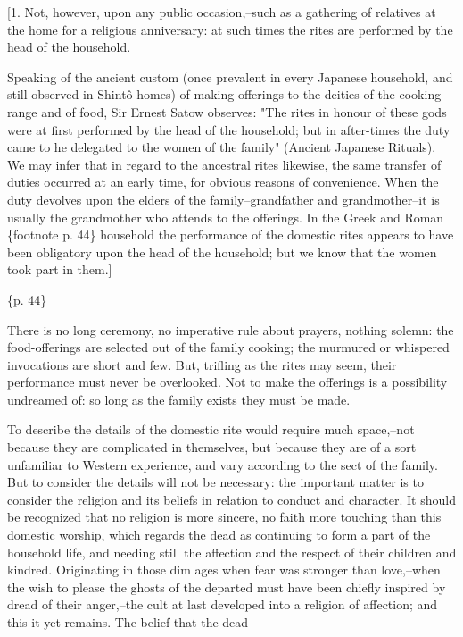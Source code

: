 [1. Not, however, upon any public occasion,--such as a gathering of relatives at the home for a religious anniversary: at such times the rites are performed by the head of the household.

Speaking of the ancient custom (once prevalent in every Japanese household, and still observed in Shintô homes) of making offerings to the deities of the cooking range and of food, Sir Ernest Satow observes: "The rites in honour of these gods were at first performed by the head of the household; but in after-times the duty came to he delegated to the women of the family" (Ancient Japanese Rituals). We may infer that in regard to the ancestral rites likewise, the same transfer of duties occurred at an early time, for obvious reasons of convenience. When the duty devolves upon the elders of the family--grandfather and grandmother--it is usually the grandmother who attends to the offerings. In the Greek and Roman \{footnote p. 44\} household the performance of the domestic rites appears to have been obligatory upon the head of the household; but we know that the women took part in them.]

\{p. 44\}

There is no long ceremony, no imperative rule about prayers, nothing solemn: the food-offerings are selected out of the family cooking; the murmured or whispered invocations are short and few. But, trifling as the rites may seem, their performance must never be overlooked. Not to make the offerings is a possibility undreamed of: so long as the family exists they must be made.

To describe the details of the domestic rite would require much space,--not because they are complicated in themselves, but because they are of a sort unfamiliar to Western experience, and vary according to the sect of the family. But to consider the details will not be necessary: the important matter is to consider the religion and its beliefs in relation to conduct and character. It should be recognized that no religion is more sincere, no faith more touching than this domestic worship, which regards the dead as continuing to form a part of the household life, and needing still the affection and the respect of their children and kindred. Originating in those dim ages when fear was stronger than love,--when the wish to please the ghosts of the departed must have been chiefly inspired by dread of their anger,--the cult at last developed into a religion of affection; and this it yet remains. The belief that the dead

